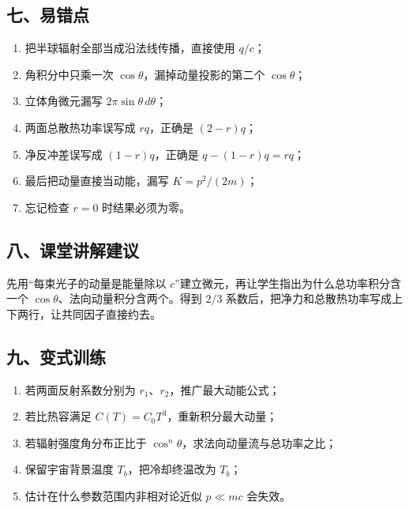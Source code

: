 \documentclass[12pt,a4paper,UTF8]{ctexart}
\newcommand{\tightlist}{\setlength{\itemsep}{0pt}\setlength{\parskip}{0pt}}
\begin{document}
\subsection{七、易错点}\label{ux4e03ux6613ux9519ux70b9-7}

\begin{enumerate}
\def\labelenumi{\arabic{enumi}.}
\tightlist
\item
  把半球辐射全部当成沿法线传播，直接使用 \(q/c\)；
\item
  角积分中只乘一次 \(\cos\theta\)，漏掉动量投影的第二个 \(\cos\theta\)；
\item
  立体角微元漏写 \(2\pi\sin\theta\,d\theta\)；
\item
  两面总散热功率误写成 \(rq\)，正确是 \((2-r)q\)；
\item
  净反冲差误写成 \((1-r)q\)，正确是 \(q-(1-r)q=rq\)；
\item
  最后把动量直接当动能，漏写 \(K=p^2/(2m)\)；
\item
  忘记检查 \(r=0\) 时结果必须为零。
\end{enumerate}

\subsection{八、课堂讲解建议}\label{ux516bux8bfeux5802ux8bb2ux89e3ux5efaux8bae-7}

先用``每束光子的动量是能量除以
\(c\)''建立微元，再让学生指出为什么总功率积分含一个
\(\cos\theta\)、法向动量积分含两个。得到 \(2/3\)
系数后，把净力和总散热功率写成上下两行，让共同因子直接约去。

\subsection{九、变式训练}\label{ux4e5dux53d8ux5f0fux8badux7ec3-7}

\begin{enumerate}
\def\labelenumi{\arabic{enumi}.}
\tightlist
\item
  若两面反射系数分别为 \(r_1\)、\(r_2\)，推广最大动能公式；
\item
  若比热容满足 \(C(T)=C_0T^3\)，重新积分最大动量；
\item
  若辐射强度角分布正比于 \(\cos^n\theta\)，求法向动量流与总功率之比；
\item
  保留宇宙背景温度 \(T_b\)，把冷却终温改为 \(T_b\)；
\item
  估计在什么参数范围内非相对论近似 \(p\ll mc\) 会失效。
\end{enumerate}
\end{document}
